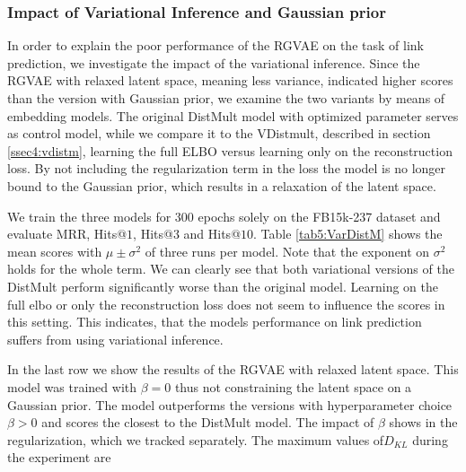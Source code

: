 




\subsubsection{Impact of Variational Inference and Gaussian prior}

In order to explain the poor performance of the RGVAE on the task of link prediction, we investigate the impact of the variational inference. Since the RGVAE with relaxed latent space, meaning less variance, indicated higher scores than the version with Gaussian prior, we examine the two variants by means of embedding models. The original DistMult model with optimized parameter serves as control model, while we compare it to the VDistmult, described in section \ref{ssec4:vdistm}, learning the full ELBO versus learning only on the reconstruction loss. By not including the regularization term in the loss the model is no longer bound to the Gaussian prior, which results in a relaxation of the latent space.

We train the three models for $300$ epochs solely on the FB15k-237 dataset and evaluate MRR, Hits@$1$, Hits@$3$ and Hits@$10$. Table \ref{tab5:VarDistM} shows the mean scores with $\mu \pm \sigma^2$ of three runs per model. Note that the exponent on $\sigma^2$ holds for the whole term. We can clearly see that both variational versions of the DistMult perform significantly worse than the original model. Learning on the full elbo or only the reconstruction loss does not seem to influence the scores in this setting. This indicates, that the models performance on link prediction suffers from using variational inference.

In the last row we show the results of the RGVAE with relaxed latent space. This model was trained with $\beta=0$ thus not constraining the latent space on a Gaussian prior. The model outperforms the versions with hyperparameter choice $\beta>0$ and scores the closest to the DistMult model. The impact of $\beta$ shows in the regularization, which we tracked separately. The maximum values of$D_{K L}$ during the experiment are 

